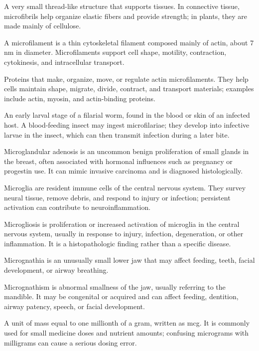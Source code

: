  A very small thread-like structure that supports tissues. In connective tissue, microfibrils help organize elastic fibers and provide strength; in plants, they are made mainly of cellulose.

 A microfilament is a thin cytoskeletal filament composed mainly of actin, about 7 nm in diameter. Microfilaments support cell shape, motility, contraction, cytokinesis, and intracellular transport.

 Proteins that make, organize, move, or regulate actin microfilaments. They help cells maintain shape, migrate, divide, contract, and transport materials; examples include actin, myosin, and actin-binding proteins.

 An early larval stage of a filarial worm, found in the blood or skin of an infected host. A blood-feeding insect may ingest microfilariae; they develop into infective larvae in the insect, which can then transmit infection during a later bite.

 Microglandular adenosis is an uncommon benign proliferation of small glands in the breast, often associated with hormonal influences such as pregnancy or progestin use. It can mimic invasive carcinoma and is diagnosed histologically.

 Microglia are resident immune cells of the central nervous system. They survey neural tissue, remove debris, and respond to injury or infection; persistent activation can contribute to neuroinflammation.

 Microgliosis is proliferation or increased activation of microglia in the central nervous system, usually in response to injury, infection, degeneration, or other inflammation. It is a histopathologic finding rather than a specific disease.

 Micrognathia is an unusually small lower jaw that may affect feeding, teeth, facial development, or airway breathing.

 Micrognathism is abnormal smallness of the jaw, usually referring to the mandible. It may be congenital or acquired and can affect feeding, dentition, airway patency, speech, or facial development.

 A unit of mass equal to one millionth of a gram, written as mcg. It is commonly used for small medicine doses and nutrient amounts; confusing micrograms with milligrams can cause a serious dosing error.

